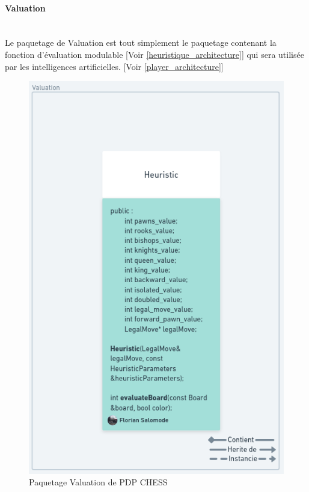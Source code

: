 \huge\documentclass{article}
\begin{document}
\paragraph{Valuation}
~~\\
\newline
Le paquetage de Valuation est tout simplement le paquetage contenant la fonction d'évaluation modulable [Voir \ref{heuristique_architecture}]
qui sera utilisée par les intelligences artificielles. [Voir \ref{player_architecture}]
\begin{figure}[!h]
    \centering
    \includegraphics[scale = 0.2]{img/Package/Valuation.png}
    \caption{Paquetage Valuation de PDP CHESS}
    \label{pck:valuation}
\end{figure}
\end{document}
